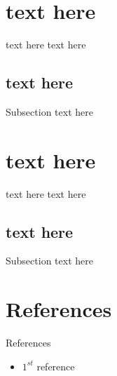 \documentclass[handout,t]{beamer}
\begin{document}
\section{text here}
\begin{frame}{text here}
	text here
\end{frame}

\subsection{text here}
\begin{frame}{Subsection}
 text here
\end{frame}
\section{text here}
\begin{frame}{text here}
	text here
\end{frame}

\subsection{text here}
\begin{frame}{Subsection}
 text here
\end{frame}
\section{References}
\begin{frame}{References}
\begin{itemize}
\item $1^{st}$ reference
\end{itemize}
\end{frame}
\end{document}
